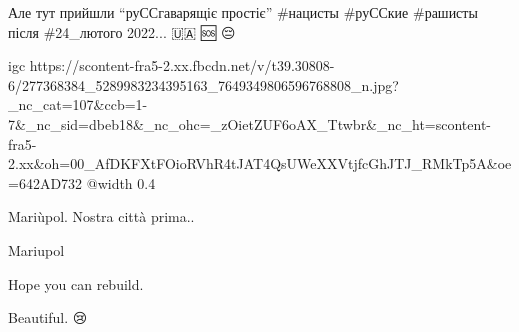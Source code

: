 Але тут прийшли \enquote{руССгаварящіє простіє} \#нацисты \#руССкие \#рашисты після \#24\_лютого 2022... 🇺🇦 🆘 😔


\ifcmt
  igc https://scontent-fra5-2.xx.fbcdn.net/v/t39.30808-6/277368384_5289983234395163_7649349806596768808_n.jpg?_nc_cat=107&ccb=1-7&_nc_sid=dbeb18&_nc_ohc=_zOietZUF6oAX_Ttwbr&_nc_ht=scontent-fra5-2.xx&oh=00_AfDKFXtFOioRVhR4tJAT4QsUWeXXVtjfcGhJTJ_RMkTp5A&oe=642AD732
	@width 0.4
\fi


Mariùpol. Nostra città prima..


Mariupol


Hope you can rebuild. 🙏🏻💙💛🇺🇦


Beautiful. 😢
